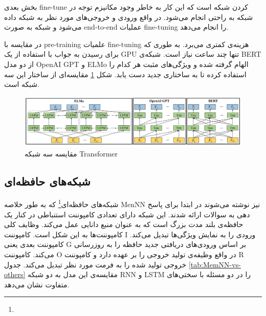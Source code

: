 \documentclass[12pt, a4paper, oneside]{report}
\begin{document}
بخش بعدی
fine-tune
کردن شبکه است که این کار به خاطر وجود مکانیزم توجه در شبکه به راحتی انجام می‌شود.
در واقع ورودی و خروجی‌های مورد نظر به شبکه داده می‌شود و شبکه به صورت
end-to-end
عملیات
fine-tuning
را انجام می‌دهد.

در مقایسه با
pre-training
علمیات
fine-tuning
هزینه‌ی کمتری می‌برد. به طوری که برای رسیدن به جواب با استفاده از یک
GPU
تنها چند ساعت نیاز است.\cite{devlin2018bert}
شبکه‌ی
BERT
از دو مدل
OpenAI GPT
و
ELMo
الهام گرفته شده و ویژگی‌های مثبت هر کدام را استفاده کرده تا به ساختاری جدید دست یابد. شکل
\ref{fig:BERTvsOTHER}
مقایسه‌ای از ساختار این سه شبکه است.

\begin{figure}[!ht]
    \centering
    \includegraphics[width=1\textwidth]{BERTvsOTHER}
    \caption{ مقایسه سه شبکه Transformer }
    \label{fig:BERTvsOTHER}
\end{figure}

\subsection{شبکه‌های حافظه‌ای}
شبکه‌های حافظه‌ای\footnote{}
که به طور خلاصه
MenNN
نیز نوشته می‌شوند در ابتدا برای پاسخ دهی به سوالات ارائه شدند. این شبکه دارای تعدادی کامپوننت استنباطی در کنار یک
حافظه‌ی بلند مدت بزرگ است که به عنوان منبع دانایی عمل می‌کند. وظایف کلی کامپوننت‌ها به این شکل است. کامپوننت
I
ورودی را به نمایش ویژگی‌ها تبدیل می‌کند. کامپوننت بعدی یعنی
G
بر اساس ورودی‌های دریافتی جدید حافظه را به روزرسانی می‌کند. کامپوننت
O
در واقع وظیفه‌ی تولید خروجی را بر عهده دارد و کامپوننت
R
خروجی تولید شده را به فرمت مورد نظر تبدیل می‌کند. جدول
\ref{tab:MemNN-vs-others}
مقایسه‌ی این مدل به دو شبکه
RNN
و
LSTM
را در دو مسئله با سختی‌های متفاوت نشان می‌دهد.
\cite{zhang2018deep}
\end{document}
